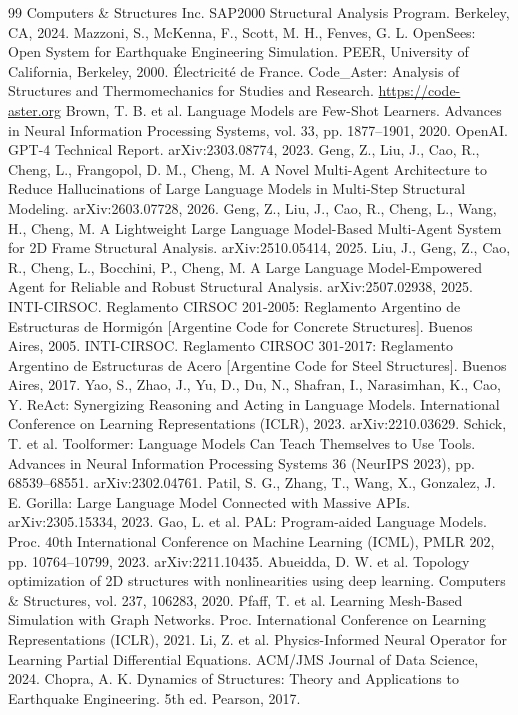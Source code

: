 \documentclass[11pt,a4paper]{article}
\begin{document}
\begin{thebibliography}{99}
 Computers \& Structures Inc. SAP2000 Structural Analysis Program. Berkeley, CA, 2024.
 Mazzoni, S., McKenna, F., Scott, M. H., Fenves, G. L. OpenSees: Open System for Earthquake Engineering Simulation. PEER, University of California, Berkeley, 2000.
 Électricité de France. Code\_Aster: Analysis of Structures and Thermomechanics for Studies and Research. \url{https://code-aster.org}
 Brown, T. B. et al. Language Models are Few-Shot Learners. Advances in Neural Information Processing Systems, vol. 33, pp. 1877–1901, 2020.
 OpenAI. GPT-4 Technical Report. arXiv:2303.08774, 2023.
 Geng, Z., Liu, J., Cao, R., Cheng, L., Frangopol, D. M., Cheng, M. A Novel Multi-Agent Architecture to Reduce Hallucinations of Large Language Models in Multi-Step Structural Modeling. arXiv:2603.07728, 2026.
 Geng, Z., Liu, J., Cao, R., Cheng, L., Wang, H., Cheng, M. A Lightweight Large Language Model-Based Multi-Agent System for 2D Frame Structural Analysis. arXiv:2510.05414, 2025.
 Liu, J., Geng, Z., Cao, R., Cheng, L., Bocchini, P., Cheng, M. A Large Language Model-Empowered Agent for Reliable and Robust Structural Analysis. arXiv:2507.02938, 2025.
 INTI-CIRSOC. Reglamento CIRSOC 201-2005: Reglamento Argentino de Estructuras de Hormigón [Argentine Code for Concrete Structures]. Buenos Aires, 2005.
 INTI-CIRSOC. Reglamento CIRSOC 301-2017: Reglamento Argentino de Estructuras de Acero [Argentine Code for Steel Structures]. Buenos Aires, 2017.
 Yao, S., Zhao, J., Yu, D., Du, N., Shafran, I., Narasimhan, K., Cao, Y. ReAct: Synergizing Reasoning and Acting in Language Models. International Conference on Learning Representations (ICLR), 2023. arXiv:2210.03629.
 Schick, T. et al. Toolformer: Language Models Can Teach Themselves to Use Tools. Advances in Neural Information Processing Systems 36 (NeurIPS 2023), pp. 68539–68551. arXiv:2302.04761.
 Patil, S. G., Zhang, T., Wang, X., Gonzalez, J. E. Gorilla: Large Language Model Connected with Massive APIs. arXiv:2305.15334, 2023.
 Gao, L. et al. PAL: Program-aided Language Models. Proc. 40th International Conference on Machine Learning (ICML), PMLR 202, pp. 10764–10799, 2023. arXiv:2211.10435.
 Abueidda, D. W. et al. Topology optimization of 2D structures with nonlinearities using deep learning. Computers \& Structures, vol. 237, 106283, 2020.
 Pfaff, T. et al. Learning Mesh-Based Simulation with Graph Networks. Proc. International Conference on Learning Representations (ICLR), 2021.
 Li, Z. et al. Physics-Informed Neural Operator for Learning Partial Differential Equations. ACM/JMS Journal of Data Science, 2024.
 Chopra, A. K. Dynamics of Structures: Theory and Applications to Earthquake Engineering. 5th ed. Pearson, 2017.
\end{thebibliography}
\end{document}
